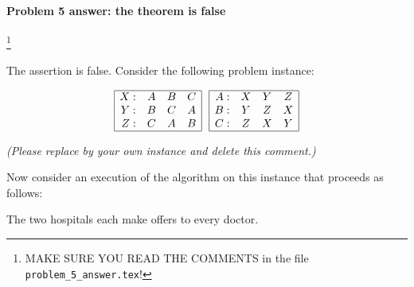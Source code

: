 


\paragraph{Problem 5 answer: the theorem is false}\footnote
{\color{red}MAKE SURE YOU READ THE COMMENTS in the file \texttt{problem\_5\_answer.tex}!}

The assertion is false.  Consider the following problem instance:

\begin{blue}                    %
\[
\begin{array}{|rccc|} \hline
  X: & A & B & C\\
  Y: & B & C & A\\
  Z: & C & A & B \\ \hline
\end{array}
~~{}
\begin{array}{|rccc|}\hline
  A: & X & Y & Z\\
  B: & Y & Z & X\\
  C: & Z & X & Y \\\hline
\end{array}
\]
\centerline{\emph{(Please replace by your own instance and delete this comment.)}}
\end{blue}

Now consider an execution of the algorithm on this instance that proceeds as follows:

\begin{blue}
  \REPLACEME
\end{blue}

The two hospitals
each make offers to every doctor.




